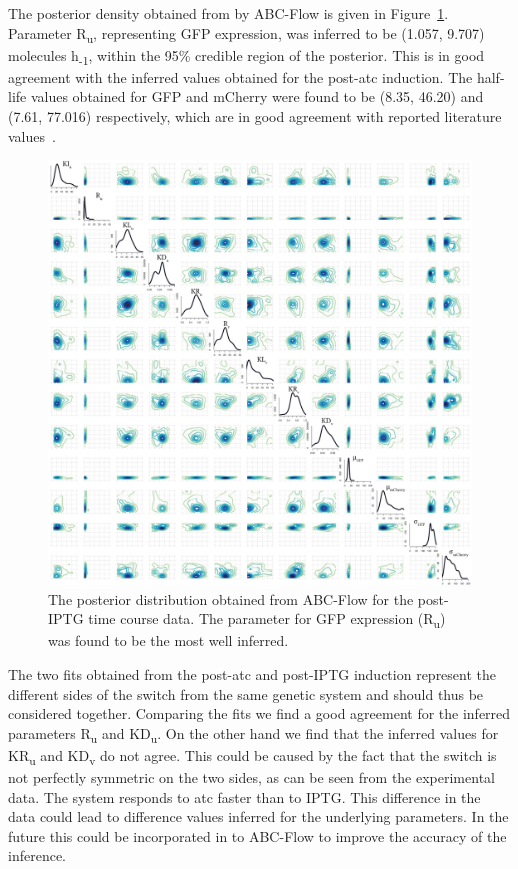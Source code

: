 The posterior density obtained from by ABC-Flow is given in Figure~\ref{fig:1atc-post}. Parameter R\textsubscript{u}, representing GFP expression, was inferred to be (1.057, 9.707) molecules h\textsubscript{-1}, within the 95\% credible region of the posterior. This is in good agreement with the inferred values obtained for the post-\acrshort{atc} induction. The half-life values obtained for GFP and mCherry were found to be (8.35, 46.20) and (7.61, 77.016) respectively, which are in good agreement with reported literature values~\autocite{Shaner:2004vy, Andersen:1998tn}. 

\begin{figure}[htbp]
\centerfloat
	\includegraphics[width=1.1\textwidth]{../../chapters/chapterABCFlow/images/posterior_iptg.png}
	\caption[Posterior distribution of inferred parameters for post-IPTG induction of the toggle switch]{\label{fig:1atc-post} The posterior distribution obtained from ABC-Flow for the post-IPTG time course data. The parameter for GFP expression (R\textsubscript{u}) was found to be the most well inferred.}
\end{figure}

The two fits obtained from the post-\acrshort{atc} and post-IPTG induction represent the different sides of the switch from the same genetic system and should thus be considered together. Comparing the fits we find a good agreement for the inferred parameters R\textsubscript{u} and KD\textsubscript{u}. On the other hand we find that the inferred values for KR\textsubscript{u} and KD\textsubscript{v} do not agree. This could be caused by the fact that the switch is not perfectly symmetric on the two sides, as can be seen from the experimental data. The system responds to \acrshort{atc} faster than to IPTG. This difference in the data could lead to difference values inferred for the underlying parameters. In the future this could be incorporated in to ABC-Flow to improve the accuracy of the inference.



